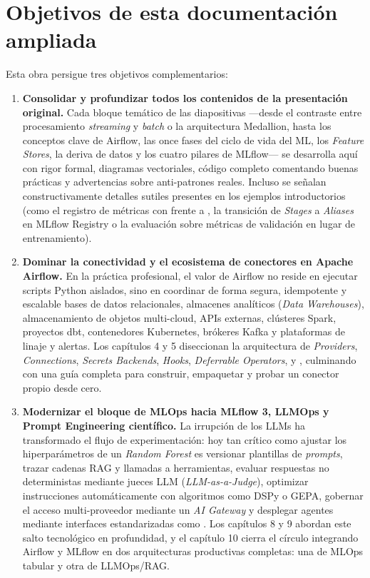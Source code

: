 \section*{Objetivos de esta documentación ampliada}

Esta obra persigue tres objetivos complementarios:

\begin{enumerate}
  \item \textbf{Consolidar y profundizar todos los contenidos de la presentación original.} Cada bloque temático de las diapositivas ---desde el contraste entre procesamiento \textit{streaming} y \textit{batch} o la arquitectura Medallion, hasta los conceptos clave de Airflow, las once fases del ciclo de vida del ML, los \textit{Feature Stores}, la deriva de datos y los cuatro pilares de MLflow--- se desarrolla aquí con rigor formal, diagramas vectoriales, código completo comentando buenas prácticas y advertencias sobre anti-patrones reales. Incluso se señalan constructivamente detalles sutiles presentes en los ejemplos introductorios (como el registro de métricas con  frente a , la transición de \textit{Stages} a \textit{Aliases} en MLflow Registry o la evaluación sobre métricas de validación en lugar de entrenamiento).
  \item \textbf{Dominar la conectividad y el ecosistema de conectores en Apache Airflow.} En la práctica profesional, el valor de Airflow no reside en ejecutar scripts Python aislados, sino en coordinar de forma segura, idempotente y escalable bases de datos relacionales, almacenes analíticos (\textit{Data Warehouses}), almacenamiento de objetos multi-cloud, APIs externas, clústeres Spark, proyectos dbt, contenedores Kubernetes, brókeres Kafka y plataformas de linaje y alertas. Los capítulos 4 y 5 diseccionan la arquitectura de \textit{Providers}, \textit{Connections}, \textit{Secrets Backends}, \textit{Hooks}, \textit{Deferrable Operators},  y , culminando con una guía completa para construir, empaquetar y probar un conector propio desde cero.
  \item \textbf{Modernizar el bloque de MLOps hacia MLflow 3, LLMOps y Prompt Engineering científico.} La irrupción de los LLMs ha transformado el flujo de experimentación: hoy tan crítico como ajustar los hiperparámetros de un \textit{Random Forest} es versionar plantillas de \textit{prompts}, trazar cadenas RAG y llamadas a herramientas, evaluar respuestas no deterministas mediante jueces LLM (\textit{LLM-as-a-Judge}), optimizar instrucciones automáticamente con algoritmos como DSPy o GEPA, gobernar el acceso multi-proveedor mediante un \textit{AI Gateway} y desplegar agentes mediante interfaces estandarizadas como . Los capítulos 8 y 9 abordan este salto tecnológico en profundidad, y el capítulo 10 cierra el círculo integrando Airflow y MLflow en dos arquitecturas productivas completas: una de MLOps tabular y otra de LLMOps/RAG.
\end{enumerate}

